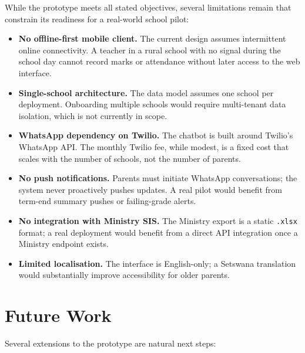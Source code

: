 \documentclass[11pt,a4paper]{article}
\begin{document}
While the prototype meets all stated objectives, several limitations remain
that constrain its readiness for a real-world school pilot:

\begin{itemize}[leftmargin=*]
    \item \textbf{No offline-first mobile client.} The current design
    assumes intermittent online connectivity. A teacher in a rural school
    with no signal during the school day cannot record marks or attendance
    without later access to the web interface.

    \item \textbf{Single-school architecture.} The data model assumes one
    school per deployment. Onboarding multiple schools would require
    multi-tenant data isolation, which is not currently in scope.

    \item \textbf{WhatsApp dependency on Twilio.} The chatbot is built
    around Twilio's WhatsApp API. The monthly Twilio fee, while modest, is
    a fixed cost that scales with the number of schools, not the number of
    parents.

    \item \textbf{No push notifications.} Parents must initiate WhatsApp
    conversations; the system never proactively pushes updates. A real
    pilot would benefit from term-end summary pushes or
    failing-grade alerts.

    \item \textbf{No integration with Ministry SIS.} The Ministry export
    is a static \texttt{.xlsx} format; a real deployment would benefit
    from a direct API integration once a Ministry endpoint exists.

    \item \textbf{Limited localisation.} The interface is English-only; a
    Setswana translation would substantially improve accessibility for
    older parents.
\end{itemize}

\section{Future Work}

Several extensions to the prototype are natural next steps:
\end{document}

